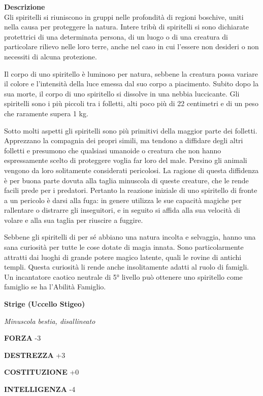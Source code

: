 \begin{multicols}{2}
	\textbf{Descrizione}\\
	Gli spiritelli si riuniscono in gruppi nelle profondità di regioni boschive, uniti nella causa per proteggere la natura. Intere tribù di spiritelli si sono dichiarate protettrici di una determinata persona, di un luogo o di una creatura di particolare rilievo nelle loro terre, anche nel caso in cui l'essere non desideri o non necessiti di alcuna protezione.

	Il corpo di uno spiritello è luminoso per natura, sebbene la creatura possa variare il colore e l'intensità della luce emessa dal suo corpo a piacimento. Subito dopo la sua morte, il corpo di uno spiritello si dissolve in una nebbia luccicante. Gli spiritelli sono i più piccoli tra i folletti, alti poco più di 22 centimetri e di un peso che raramente supera 1 kg.

	Sotto molti aspetti gli spiritelli sono più primitivi della maggior parte dei folletti. Apprezzano la compagnia dei propri simili, ma tendono a diffidare degli altri folletti e presumono che qualsiasi umanoide o creatura che non hanno espressamente scelto di proteggere voglia far loro del male. Persino gli animali vengono da loro solitamente considerati pericolosi. La ragione di questa diffidenza è per buona parte dovuta alla taglia minuscola di queste creature, che le rende facili prede per i predatori. Pertanto la reazione iniziale di uno spiritello di fronte a un pericolo è darsi alla fuga: in genere utilizza le sue capacità magiche per rallentare o distrarre gli inseguitori, e in seguito si affida alla sua velocità di volare e alla sua taglia per riuscire a fuggire.

	Sebbene gli spiritelli di per sé abbiano una natura incolta e selvaggia, hanno una sana curiosità per tutte le cose dotate di magia innata. Sono particolarmente attratti dai luoghi di grande potere magico latente, quali le rovine di antichi templi. Questa curiosità li rende anche insolitamente adatti al ruolo di famigli. Un incantatore caotico neutrale di 5° livello può ottenere uno spiritello come famiglio se ha l'Abilità Famiglio.


	\medskip{}\textbf{Strige (Uccello Stigeo)}

	\textit{Minuscola bestia, disallineato}

	\textbf{FORZA} -3

	\textbf{DESTREZZA} +3

	\textbf{COSTITUZIONE} +0

	\textbf{INTELLIGENZA} -4


\end{multicols}
